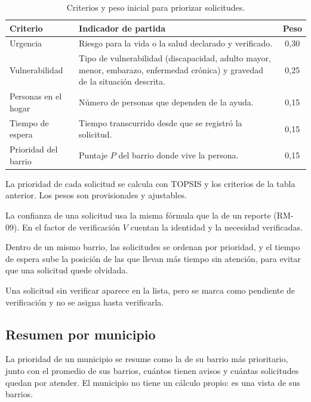 \begin{table}[H]
\centering
\caption{Criterios y peso inicial para priorizar solicitudes.}
\begin{tabularx}{\textwidth}{@{}p{3.6cm}Xc@{}}
\toprule
\textbf{Criterio} & \textbf{Indicador de partida} & \textbf{Peso} \\
\midrule
Urgencia & Riesgo para la vida o la salud declarado y verificado. & 0,30 \\
Vulnerabilidad & Tipo de vulnerabilidad (discapacidad, adulto mayor, menor, embarazo, enfermedad crónica) y gravedad de la situación descrita. & 0,25 \\
Personas en el hogar & Número de personas que dependen de la ayuda. & 0,15 \\
Tiempo de espera & Tiempo transcurrido desde que se registró la solicitud. & 0,15 \\
Prioridad del barrio & Puntaje $P$ del barrio donde vive la persona. & 0,15 \\
\bottomrule
\end{tabularx}
\end{table}

\begin{description}[leftmargin=0pt]
  \item[RM-23 (\Must).] La prioridad de cada solicitud se calcula con TOPSIS y los criterios de la tabla anterior. Los pesos son provisionales y ajustables.
  \item[RM-24 (\Must).] La confianza de una solicitud usa la misma fórmula que la de un reporte (RM-09). En el factor de verificación $V$ cuentan la identidad y la necesidad verificadas.
  \item[RM-25 (\Should).] Dentro de un mismo barrio, las solicitudes se ordenan por prioridad, y el tiempo de espera sube la posición de las que llevan más tiempo sin atención, para evitar que una solicitud quede olvidada.
  \item[RM-26 (\Should).] Una solicitud sin verificar aparece en la lista, pero se marca como pendiente de verificación y no se asigna hasta verificarla.
\end{description}

\subsection{Resumen por municipio}
\begin{description}[leftmargin=0pt]
  \item[RM-32 (\Should).] La prioridad de un municipio se resume como la de su barrio más prioritario, junto con el promedio de sus barrios, cuántos tienen avisos y cuántas solicitudes quedan por atender. El municipio no tiene un cálculo propio: es una vista de sus barrios.
\end{description}


